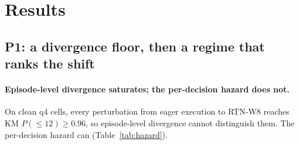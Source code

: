 \section{Results}
\label{sec:results}

\subsection{P1: a divergence floor, then a regime that ranks the shift}
\label{sec:p1}

\paragraph{Episode-level divergence saturates; the per-decision hazard does not.} On clean q4 cells, every perturbation from eager execution to RTN-W8 reaches KM $P(\le 12) \ge 0.96$, so episode-level divergence cannot distinguish them. The per-decision hazard can (Table~\ref{tab:hazard}).

\begin{table}[t]
\centering
\footnotesize
\setlength{\tabcolsep}{3pt}
\caption{Clean q4: median closed-loop shift \absd{} (bf16 grid), per-decision divergence hazard (95\% task-bootstrap CI where available), and episode-level divergence. Live snapshot 2026-09-29T02:36Z.}
\label{tab:hazard}
\end{table}

